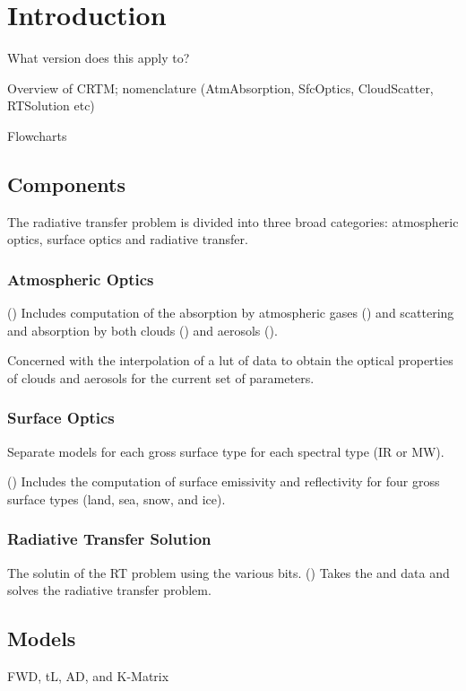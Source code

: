 \chapter{Introduction}

What version does this apply to?

Overview of CRTM; nomenclature (AtmAbsorption, SfcOptics, CloudScatter, RTSolution etc)

Flowcharts


\section{Components}
The radiative transfer problem is divided into three broad categories: atmospheric optics, surface optics and radiative transfer.

\subsection{Atmospheric Optics}
(\AtmOptics) Includes computation of the absorption by atmospheric gases (\AtmAbsorption) and scattering and absorption by both clouds (\CloudScatter) and aerosols (\AerosolScatter).

  Concerned with the interpolation of a lut of data to obtain the optical properties of clouds and aerosols for the current set of parameters.


\subsection{Surface Optics}
  Separate models for each gross surface type for each spectral type (IR or MW).

(\SfcOptics) Includes the computation of surface emissivity and reflectivity for four gross surface types (land, sea, snow, and ice).

\subsection{Radiative Transfer Solution}
  The solutin of the RT problem using the various bits.
(\RTSolution) Takes the \AtmOptics{} and \SfcOptics{} data and solves the radiative transfer problem.


\section{Models}
FWD, tL, AD, and K-Matrix

